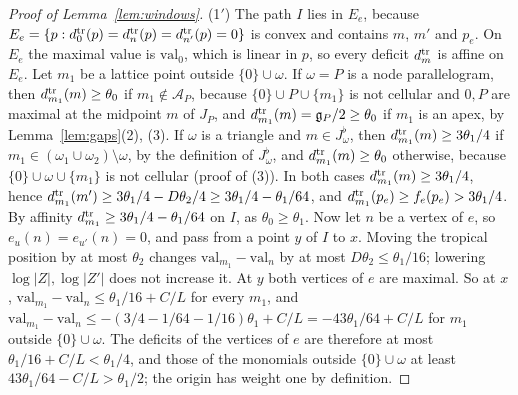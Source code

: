 \begin{proof}[Proof of Lemma~\ref{lem:windows}]
(1$'$) The path $I$ lies in $E_e$, because $E_e=\{p:d^{\rm tr}_0(p)=d^{\rm tr}_n(p)=d^{\rm tr}_{n'}(p)=0\}$ is convex and
contains $m$, $m'$ and $p_e$. On $E_e$ the maximal value is $\mathrm{val}_0$, which is linear in $p$, so every deficit
$d^{\rm tr}_m$ is affine on $E_e$. Let $m_1$ be a lattice point outside $\{0\}\cup\omega$. If $\omega=P$ is a node
parallelogram, then $d^{\rm tr}_{m_1}(m)\ge\theta_0$ if $m_1\notin\mathcal A_P$, because $\{0\}\cup P\cup\{m_1\}$ is not
cellular and $0,P$ are maximal at the midpoint $m$ of $J_P$, and $d^{\rm tr}_{m_1}(m)=\mathfrak g_P/2\ge\theta_0$ if $m_1$ is
an apex, by Lemma~\ref{lem:gaps}(2), (3). If $\omega$ is a triangle and $m\in J^\flat_\omega$, then
$d^{\rm tr}_{m_1}(m)\ge3\theta_1/4$ if $m_1\in(\omega_1\cup\omega_2)\setminus\omega$, by the definition of $J^\flat_\omega$, and
$d^{\rm tr}_{m_1}(m)\ge\theta_0$ otherwise, because $\{0\}\cup\omega\cup\{m_1\}$ is not cellular (proof of (3)). In both cases
$d^{\rm tr}_{m_1}(m)\ge3\theta_1/4$, hence $d^{\rm tr}_{m_1}(m')\ge3\theta_1/4-D\theta_2/4\ge3\theta_1/4-\theta_1/64$, and
$d^{\rm tr}_{m_1}(p_e)\ge f_e(p_e)>3\theta_1/4$. By affinity $d^{\rm tr}_{m_1}\ge3\theta_1/4-\theta_1/64$ on $I$, as
$\theta_0\ge\theta_1$. Now let $n$ be a vertex of $e$, so $e_u(n)=e_{u'}(n)=0$, and pass from a point $y$ of $I$ to $x$.
Moving the tropical position by at most $\theta_2$ changes $\mathrm{val}_{m_1}-\mathrm{val}_n$ by at most
$D\theta_2\le\theta_1/16$; lowering $\log|Z|,\log|Z'|$ does not increase it. At $y$ both vertices of $e$ are maximal. So
at $x$, $\mathrm{val}_{m_1}-\mathrm{val}_n\le\theta_1/16+C/L$ for every $m_1$, and
$\mathrm{val}_{m_1}-\mathrm{val}_n\le-(3/4-1/64-1/16)\theta_1+C/L=-43\theta_1/64+C/L$ for $m_1$ outside $\{0\}\cup\omega$. The
deficits of the vertices of $e$ are therefore at most $\theta_1/16+C/L<\theta_1/4$, and those of the monomials outside
$\{0\}\cup\omega$ at least $43\theta_1/64-C/L>\theta_1/2$; the origin has weight one by definition.


\end{proof}
